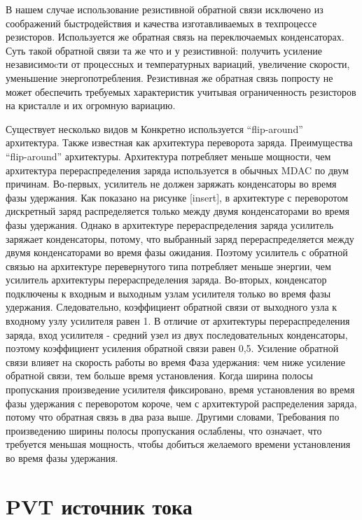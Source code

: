 \documentclass[a4paper,12pt]{article} %
\begin{document}
В нашем случае использование резистивной обратной связи исключено из соображений быстродействия и качества изготавливаемых в техпроцессе резисторов. Используется же обратная связь на переключаемых конденсаторах. 
Суть такой обратной связи та же что и у резистивной: получить усиление независимоcти от процессных  и температурных вариаций, увеличение скорости, уменьшение энергопотребления. Резистивная же обратная связь попросту не может обеспечить требуемых характеристик учитывая ограниченность резисторов на кристалле и их огромную вариацию. 

Существует несколько видов м
Конкретно используется “flip-around” архитектура. Также известная как архитектура переворота заряда.
Преимущества “flip-around” архитектуры. Архитектура потребляет меньше мощности, чем архитектура перераспределения заряда используется в обычных MDAC по двум причинам. Во-первых, усилитель не должен заряжать конденсаторы во время фазы удержания. Как показано на рисунке [insert], в архитектуре с переворотом дискретный заряд распределяется только между двумя конденсаторами во время фазы удержания. Однако в архитектуре перераспределения заряда усилитель заряжает конденсаторы, потому, что выбранный заряд перераспределяется между двумя конденсаторами во время фазы ожидания. Поэтому усилитель с обратной связью на архитектуре перевернутого типа потребляет меньше энергии, чем усилитель архитектуры перераспределения заряда. Во-вторых, конденсатор подключены к входным и выходным узлам усилителя только во время фазы удержания. Следовательно, коэффициент обратной связи от выходного узла к входному узлу усилителя равен 1. В отличие от архитектуры перераспределения заряда, вход усилителя - средний узел из двух последовательных конденсаторы, поэтому коэффициент усиления обратной связи равен 0,5. Усиление обратной связи влияет на скорость работы во время Фаза удержания: чем ниже усиление обратной связи, тем больше время установления. Когда ширина полосы пропускания произведение усилителя фиксировано, время установления во время фазы удержания с переворотом короче, чем с архитектурой распределения заряда, потому что обратная связь в два раза выше. Другими словами, Требования по произведению ширины полосы пропускания ослаблены, что означает, что требуется меньшая мощность, чтобы добиться желаемого времени установления во время фазы удержания.






\section{PVT источник тока}
\end{document}
